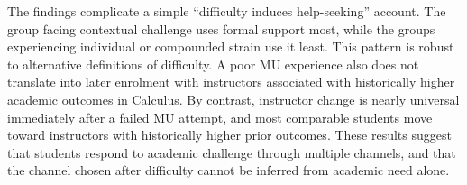 \documentclass[11pt,a4paper]{article}
\begin{document}
The findings complicate a simple ``difficulty induces help-seeking'' account. The group facing contextual challenge uses formal support most, while the groups experiencing individual or compounded strain use it least. This pattern is robust to alternative definitions of difficulty. A poor MU experience also does not translate into later enrolment with instructors associated with historically higher academic outcomes in Calculus. By contrast, instructor change is nearly universal immediately after a failed MU attempt, and most comparable students move toward instructors with historically higher prior outcomes. These results suggest that students respond to academic challenge through multiple channels, and that the channel chosen after difficulty cannot be inferred from academic need alone.
\end{document}
